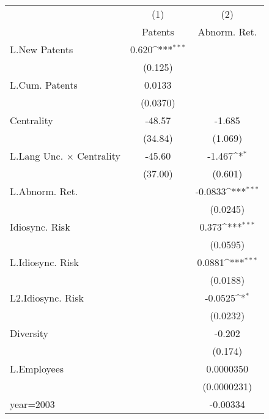 {
\def\sym#1{\ifmmode^{#1}\else\(^{#1}\)\fi}
\begin{tabular}{l*{2}{c}}
\hline\hline
                    &\multicolumn{1}{c}{(1)}&\multicolumn{1}{c}{(2)}\\
                    &\multicolumn{1}{c}{Patents}&\multicolumn{1}{c}{Abnorm. Ret.}\\
\hline
L.New Patents       &       0.620\sym{***}&                     \\
                    &     (0.125)         &                     \\
L.Cum. Patents      &      0.0133         &                     \\
                    &    (0.0370)         &                     \\
Centrality          &      -48.57         &      -1.685         \\
                    &     (34.84)         &     (1.069)         \\
L.Lang Unc. $\times$ Centrality&      -45.60         &      -1.467\sym{*}  \\
                    &     (37.00)         &     (0.601)         \\
L.Abnorm. Ret.      &                     &     -0.0833\sym{***}\\
                    &                     &    (0.0245)         \\
Idiosync. Risk      &                     &       0.373\sym{***}\\
                    &                     &    (0.0595)         \\
L.Idiosync. Risk    &                     &      0.0881\sym{***}\\
                    &                     &    (0.0188)         \\
L2.Idiosync. Risk   &                     &     -0.0525\sym{*}  \\
                    &                     &    (0.0232)         \\
Diversity           &                     &      -0.202         \\
                    &                     &     (0.174)         \\
L.Employees         &                     &   0.0000350         \\
                    &                     & (0.0000231)         \\
year=2003           &                     &    -0.00334         \\

\end{tabular}}
